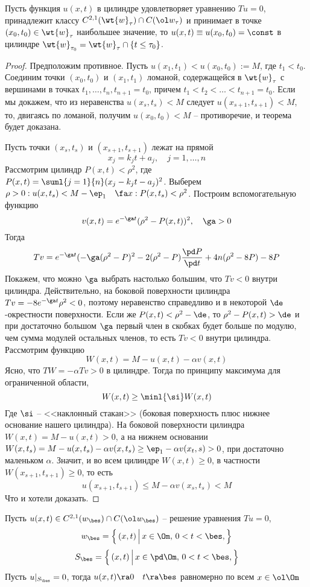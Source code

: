 \documentclass[a4paper,draft]{article}
\begin{document}
\begin{theorem}
Пусть функция $u(x,t)$ в цилиндре
удовлетворяет уравнению $Tu=0$, принадлежит классу $C^{2,1}(\wt{w}_\tau)\cap C(\ol w_\tau)$  и
принимает в точке $(x_0,t_0)\in \wt{w}_\tau$ наибольшее значение, то $u(x,t)\equiv u(x_0,t_0)=\const$ в цилиндре
$\wt{w}_{\tau_0}=\wt{w}_\tau\cap\{t\le\tau_0\}$.
\end{theorem}
\begin{proof}
Предположим противное. Пусть $u(x_1,t_1)<u(x_0,t_0):=M$, где $t_1<t_0$. Соединим точки $(x_0,t_0)$ и $(x_1,t_1)$ ломаной,
содержащейся в $\wt{w}_\tau$ с вершинами в точках $t_1,\ldots,t_n,t_{n+1}=t_0$, причем $t_1<t_2<\ldots<t_{n+1}=t_0$.
Если мы докажем, что из неравенства $u(x_s,t_s)<M$ следует $u(x_{s+1},t_{s+1})<M$, то, двигаясь по ломаной, получим
$u(x_0,t_0)<M$ -- противоречие, и теорема будет доказана.

Пусть
точки $(x_s,t_s)$ и $(x_{s+1},t_{s+1})$ лежат на прямой
$$
x_j=k_j t+a_j,\quad j=1,\ldots,n
$$
Рассмотрим цилиндр $P(x,t)<\rho^2$, где $P(x,t)=\suml{j=1}{n}
(x_j-k_j t-a_j)^2$. Выберем $\rho>0: u(x,t_s)<M-\ep_1\quad
\fa x: P(x,t_s)<\rho^2$. Построим вспомогательную функцию
$$
v(x,t)=e^{-\ga t}(\rho^2-P(x,t))^2,\quad \ga>0
$$
Тогда
$$
Tv=e^{-\ga t}(-\ga(\rho^2-P)^2-2(\rho^2-P)\frac{\pd
P}{\pd t}+4n(\rho^2-8P)-8P
$$
Покажем, что можно $\ga$ выбрать настолько большим, что $Tv<0$
внутри цилиндра. Действительно, на боковой поверхности цилиндра
$Tv=-8e^{-\ga t}\rho^2<0$, поэтому неравенство справедливо и в
некоторой $\de$-окрестности поверхности. Если же
$P(x,t)<\rho^2-\de$, то $\rho^2-P(x,t)>\de$ и при достаточно
большом $\ga$ первый член в скобках будет больше по модулю, чем
сумма модулей остальных членов, то есть $Tv<0$ внутри цилиндра.
Рассмотрим функцию
$$
W(x,t)=M-u(x,t)-\alpha v(x,t)
$$
Ясно, что $TW=-\alpha Tv>0$ в цилиндре. Тогда по принципу
максимума для ограниченной области,
$$
W(x,t)\ge \minl{\si} W(x,t)
$$
Где $\si$ -- <<наклонный стакан>> (боковая поверхность плюс нижнее
основание нашего цилиндра). На боковой поверхности цилиндра
$W(x,t)=M-u(x,t)>0$, а на нижнем основании
$W(x,t_s)=M-u(x,t_s)-\alpha v(x,t_s)\ge \ep_1-\alpha
v(x_t,s)>0$, при достаточно маленьком $\alpha$. Значит, и во всем
цилиндре $W(x,t)\ge 0$, в частности $W(x_{s+1},t_{s+1})\ge 0$,
то есть
$$
u(x_{s+1},t_{s+1})\le M-\alpha v(x_s,t_s)<M
$$
Что и хотели доказать.
\end{proof}

\begin{theorem}[о стабилизации]
Пусть $u(x,t)\in C^{2,1}(w_\bes)\cap C(\ol w_\bes)$ --
решение уравнения $Tu=0$,
$$
w_\bes=\left\{\,(x,t)\,\Bigl|\,x\in \Om,\,0<t<\bes,
\right\}
$$
$$
S_\bes=\left\{\,(x,t)\,\Bigl|\,x\in \pd\Om,\,0<t<\bes,
\right\}
$$
Пусть $u|_{S_\bes}=0$, тогда $u(x,t)\ra0\quad
t\ra \bes$ равномерно по всем $x \in \ol\Om$
\end{theorem}
\end{document}
